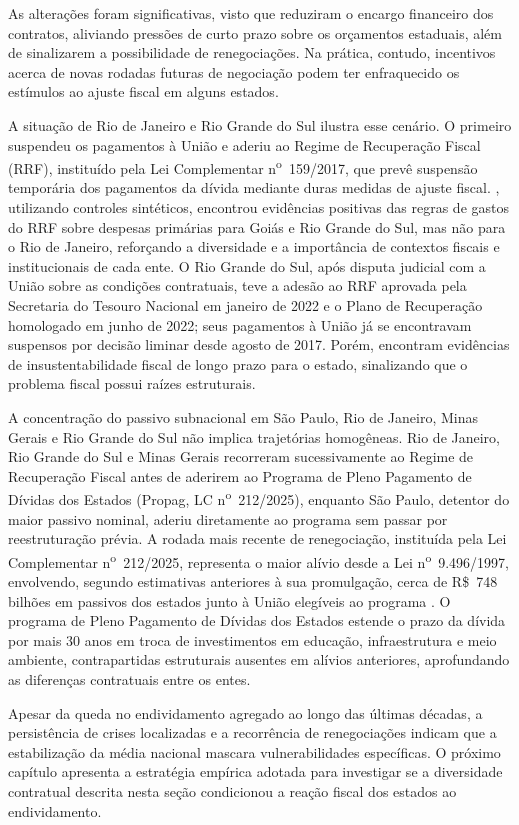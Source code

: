 As alterações foram significativas, visto que reduziram o encargo financeiro dos contratos, aliviando pressões de curto prazo sobre os orçamentos estaduais, além de sinalizarem a possibilidade de renegociações. Na prática, contudo, incentivos acerca de novas rodadas futuras de negociação podem ter enfraquecido os estímulos ao ajuste fiscal em alguns estados.

A situação de Rio de Janeiro e Rio Grande do Sul ilustra esse cenário. O primeiro suspendeu os pagamentos à União e aderiu ao Regime de Recuperação Fiscal (RRF), instituído pela Lei Complementar n\textsuperscript{o}~159/2017, que prevê suspensão temporária dos pagamentos da dívida mediante duras medidas de ajuste fiscal. , utilizando controles sintéticos, encontrou evidências positivas das regras de gastos do RRF sobre despesas primárias para Goiás e Rio Grande do Sul, mas não para o Rio de Janeiro, reforçando a diversidade e a importância de contextos fiscais e institucionais de cada ente. O Rio Grande do Sul, após disputa judicial com a União sobre as condições contratuais, teve a adesão ao RRF aprovada pela Secretaria do Tesouro Nacional em janeiro de 2022 e o Plano de Recuperação homologado em junho de 2022; seus pagamentos à União já se encontravam suspensos por decisão liminar desde agosto de 2017. Porém,  encontram evidências de insustentabilidade fiscal de longo prazo para o estado, sinalizando que o problema fiscal possui raízes estruturais.

A concentração do passivo subnacional em São Paulo, Rio de Janeiro, Minas Gerais e Rio Grande do Sul não implica trajetórias homogêneas. Rio de Janeiro, Rio Grande do Sul e Minas Gerais recorreram sucessivamente ao Regime de Recuperação Fiscal antes de aderirem ao Programa de Pleno Pagamento de Dívidas dos Estados (Propag, LC n\textsuperscript{o}~212/2025), enquanto São Paulo, detentor do maior passivo nominal, aderiu diretamente ao programa sem passar por reestruturação prévia. A rodada mais recente de renegociação, instituída pela Lei Complementar n\textsuperscript{o}~212/2025, representa o maior alívio desde a Lei n\textsuperscript{o}~9.496/1997, envolvendo, segundo estimativas anteriores à sua promulgação, cerca de R\$~748 bilhões em passivos dos estados junto à União elegíveis ao programa \cite{NovaRenegociacaoDivida2024}. O programa de Pleno Pagamento de Dívidas dos Estados estende o prazo da dívida por mais 30 anos em troca de investimentos em educação, infraestrutura e meio ambiente, contrapartidas estruturais ausentes em alívios anteriores, aprofundando as diferenças contratuais entre os entes.

Apesar da queda no endividamento agregado ao longo das últimas décadas, a persistência de crises localizadas e a recorrência de renegociações indicam que a estabilização da média nacional mascara vulnerabilidades específicas. O próximo capítulo apresenta a estratégia empírica adotada para investigar se a diversidade contratual descrita nesta seção condicionou a reação fiscal dos estados ao endividamento.